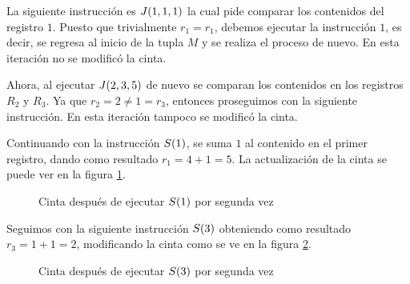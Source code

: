 La siguiente instrucción es $J\pa*{1, 1, 1}$ la cual pide comparar los contenidos del registro $1$. Puesto que trivialmente $r_{1} = r_{1}$, debemos ejecutar la instrucción $1$, es decir, se regresa al inicio de la tupla $M$ y se realiza el proceso de nuevo. En esta iteración no se modificó la cinta.

Ahora, al ejecutar $J\pa*{2, 3, 5}$ de nuevo se comparan los contenidos en los registros $R_{2}$ y $R_{3}$. Ya que $r_{2} = 2\neq 1 = r_{3}$, entonces proseguimos con la siguiente instrucción. En esta iteración tampoco se modificó la cinta.

Continuando con la instrucción $S\pa*{1}$, se suma $1$ al contenido en el primer registro, dando como resultado $r_{1} = 4 + 1 = 5$. La actualización de la cinta se puede ver en la figura \ref{fig:cinta_despues_de_s1_segunda_vez}.

\begin{figure}[h!]
	\centering


	\caption{Cinta después de ejecutar $S\pa*{1}$ por segunda vez}
	\label{fig:cinta_despues_de_s1_segunda_vez}
\end{figure}

Seguimos con la siguiente instrucción $S\pa*{3}$ obteniendo como resultado $r_{3} = 1 + 1 = 2$, modificando la cinta como se ve en la figura \ref{fig:cinta_despues_de_s3_segunda_vez}.

\begin{figure}[h!]
	\centering


	\caption{Cinta después de ejecutar $S\pa*{3}$ por segunda vez}
	\label{fig:cinta_despues_de_s3_segunda_vez}
\end{figure}


